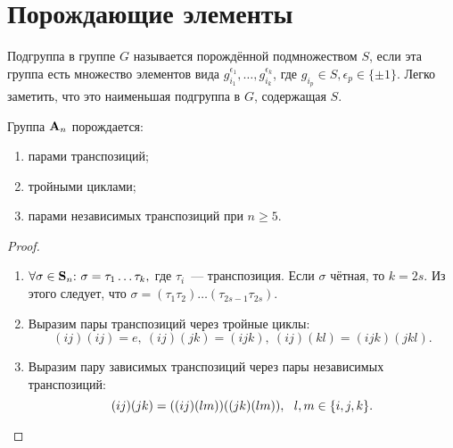 \newpage
        \section{Порождающие элементы}
        \setcounter{definition}{0}
        \begin{definition}
            Подгруппа в группе $G$ называется порождённой подмножеством $S$, если эта группа
            есть множество элементов вида ${g_{i_1}^{\epsilon_1},\ldots,g_{i_k}^{\epsilon_k}}$, где ${g_{i_p} \in S, \epsilon_p \in \{\pm1\}.}$ Легко заметить, что это наименьшая подгруппа в $G$, содержащая $S$.
        \end{definition}
        \begin{statement}
            Группа $\mathbf{A}_n$ порождается:
            \
            \begin{enumerate}
            \setlength\itemsep{0.1em}
                \item парами транспозиций; 
                \item тройными циклами;
                \item парами независимых транспозиций при $n \geqslant 5$.
            \end{enumerate}
        \end{statement}
        \begin{proof}
            \
            \begin{enumerate}
            \setlength\itemsep{0.1em}
                \item ${\forall \sigma \in \mathbf{S}_n{:}{ } \  \sigma = \tau_1 \ldots \tau_k,}$ где $\tau_i$~--- транспозиция. Если $\sigma$ чётная, то ${k = 2s.}$ Из этого следует, что ${\sigma = (\tau_1 \tau_2)\ldots(\tau_{2s-1}\tau_{2s}).}$
                \item Выразим пары транспозиций через тройные циклы:
                \begin{equation*}
                    (ij)(ij) = e, \ (ij)(jk) = (ijk), \ (ij)(kl) = (ijk)(jkl).
                \end{equation*}
                \item Выразим пару зависимых транспозиций через пары независимых транспозиций:
                \begin{equation*}
                    (ij)(jk) = ((ij)(lm))((jk)(lm)), \ \ l,m \in \{i, j, k\}. \qedhere
                \end{equation*}
            \end{enumerate}
        \end{proof}
